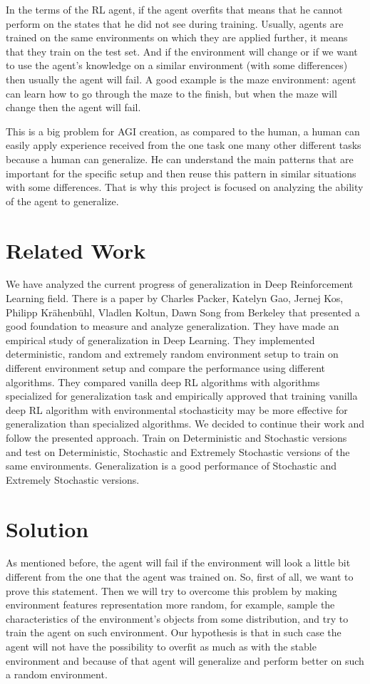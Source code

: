 In the terms of the RL agent, if the agent overfits that means that he cannot perform on the states that he did not see during training. Usually, agents are trained on the same environments on which they are applied further, it means that they train on the test set. And if the environment will change or if we want to use the agent's knowledge on a similar environment (with some differences) then usually the agent will fail. A good example is the maze environment: agent can learn how to go through the maze to the finish, but when the maze will change then the agent will fail. 

This is a big problem for AGI creation, as compared to the human, a human can easily apply experience received from the one task one many other different tasks because a human can generalize. He can understand the main patterns that are important for the specific setup and then reuse this pattern in similar situations with some differences. That is why this project is focused on analyzing the ability of the agent to generalize.


\section{Related Work}

We have analyzed the current progress of generalization in Deep Reinforcement Learning field. There is a paper \cite{GeneralizationPaper} by Charles Packer, Katelyn Gao, Jernej Kos, Philipp Krähenbühl, Vladlen Koltun, Dawn Song from Berkeley that presented a good foundation to measure and analyze generalization. They have made an empirical study of generalization in Deep Learning. They implemented deterministic, random and extremely random environment setup to train on different environment setup and compare the performance using different algorithms. They compared vanilla deep RL algorithms with algorithms specialized for generalization task and empirically approved that training vanilla deep RL algorithm with environmental stochasticity may be more effective for generalization than specialized algorithms. We decided to continue their work and follow the presented approach. Train on Deterministic and Stochastic versions and test on Deterministic, Stochastic and Extremely Stochastic versions of the same environments. Generalization is a good performance of Stochastic and Extremely Stochastic versions.

\section{Solution}
As mentioned before, the agent will fail if the environment will look a little bit different from the one that the agent was trained on. So, first of all, we want to prove this statement. Then we will try to overcome this problem by making environment features representation more random, for example, sample the characteristics of the environment's objects from some distribution, and try to train the agent on such environment. Our hypothesis is that in such case the agent will not have the possibility to overfit as much as with the stable environment and because of that agent will generalize and perform better on such a random environment.

